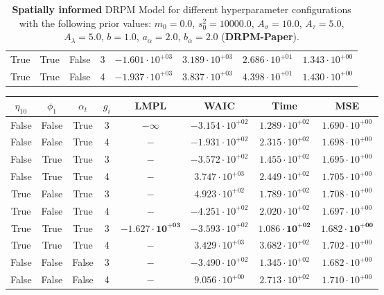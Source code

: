 \documentclass[12pt,a4paper]{article}
\begin{document}
\begin{table}
\begin{tabular}{cccccccc}
True & True & False & 3 & $-1.601 \cdot 10^{+03}$ & $3.189 \cdot 10^{+03}$ & $2.686 \cdot 10^{+01}$ & $1.343 \cdot 10^{+00}$ \\
True & True & False & 4 & $-1.937 \cdot 10^{+03}$ & $3.837 \cdot 10^{+03}$ & $4.398 \cdot 10^{+01}$ & $1.430 \cdot 10^{+00}$ \\
\bottomrule
\end{tabular}
\caption{\textbf{Spatially informed} DRPM Model for different hyperparameter configurations with the following prior values: $m_0 = 0.0$, $s_0^2 = 10000.0$, $A_\sigma = 10.0$, $A_\tau = 5.0$, $A_\lambda = 5.0$, $b = 1.0$, $a_\alpha = 2.0$, $b_\alpha = 2.0$ (\textbf{DRPM-Paper}).}
\label{tab:DRPMExtensionDRPMPaper}
\end{table}

\begin{table}
\centering\begin{tabular}{cccccccc}
\toprule
$\eta_{10}$ & $\phi_1$ & $\alpha_t$ & $g_i$ & LMPL & WAIC & Time & MSE \\
\midrule
False & False & True & 3 & $-\infty$ & $-3.154 \cdot 10^{+02}$ & $1.289 \cdot 10^{+02}$ & $1.690 \cdot 10^{+00}$ \\
False & False & True & 4 & $-$ & $-1.931 \cdot 10^{+02}$ & $2.315 \cdot 10^{+02}$ & $1.698 \cdot 10^{+00}$ \\
False & True & True & 3 & $-$ & $-3.572 \cdot 10^{+02}$ & $1.455 \cdot 10^{+02}$ & $1.695 \cdot 10^{+00}$ \\
False & True & True & 4 & $-$ & $3.747 \cdot 10^{+03}$ & $2.449 \cdot 10^{+02}$ & $1.705 \cdot 10^{+00}$ \\
True & False & True & 3 & $-$ & $4.923 \cdot 10^{+02}$ & $1.789 \cdot 10^{+02}$ & $1.708 \cdot 10^{+00}$ \\
True & False & True & 4 & $-$ & $-4.251 \cdot 10^{+02}$ & $2.020 \cdot 10^{+02}$ & $1.697 \cdot 10^{+00}$ \\
True & True & True & 3 & $\mathbf{-1.627 \cdot 10^{+03}}$ & $-3.593 \cdot 10^{+02}$ & $\mathbf{1.086 \cdot 10^{+02}}$ & $\mathbf{1.682 \cdot 10^{+00}}$ \\
True & True & True & 4 & $-$ & $3.429 \cdot 10^{+03}$ & $3.682 \cdot 10^{+02}$ & $1.702 \cdot 10^{+00}$ \\
False & False & False & 3 & $-$ & $-3.490 \cdot 10^{+02}$ & $1.345 \cdot 10^{+02}$ & $1.682 \cdot 10^{+00}$ \\
False & False & False & 4 & $-$ & $9.056 \cdot 10^{+00}$ & $2.713 \cdot 10^{+02}$ & $1.710 \cdot 10^{+00}$ \\

\end{tabular}
\end{table}
\end{document}
